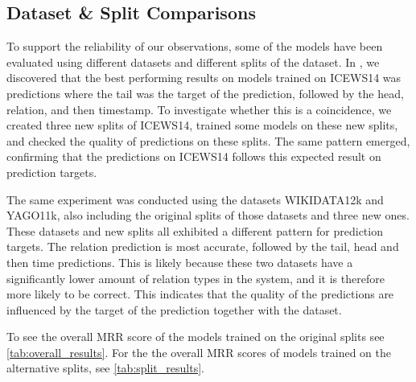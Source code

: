 \subsection{Dataset \& Split Comparisons}
\label{subsec:dataset_split_comparisons}

To support the reliability of our observations, some of the models have been evaluated using different datasets and different splits of the dataset. In \cite{P9}, we discovered that the best performing results on models trained on ICEWS14 was predictions where the tail was the target of the prediction, followed by the head, relation, and then timestamp. To investigate whether this is a coincidence, we created three new splits of ICEWS14, trained some models on these new splits, and checked the quality of predictions on these splits. The same pattern emerged, confirming that the predictions on ICEWS14 follows this expected result on prediction targets.

The same experiment was conducted using the datasets WIKIDATA12k and YAGO11k, also including the original splits of those datasets and three new ones. These datasets and new splits all exhibited a different pattern for prediction targets. The relation prediction is most accurate, followed by the tail, head and then time predictions. This is likely because these two datasets have a significantly lower amount of relation types in the system, and it is therefore more likely to be correct. This indicates that the quality of the predictions are influenced by the target of the prediction together with the dataset.




To see the overall MRR score of the models trained on the original splits see \autoref{tab:overall_results}. For the the overall MRR scores of models trained on the alternative splits, see \autoref{tab:split_results}.
